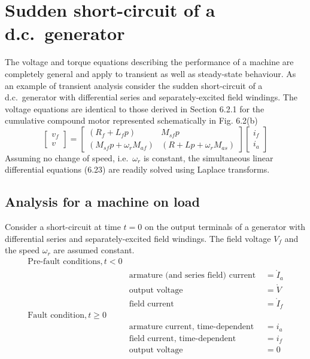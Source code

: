 \documentclass[a4paper,numbers=noenddot,12pt]{scrbook}
\begin{document}
\section{Sudden short-circuit of a d.c.\ generator}
The voltage and torque equations describing the performance of a machine are completely general and apply to transient as well as steady-state behaviour. As an example of transient analysis consider the sudden short-circuit of a d.c.\ generator with differential series and separately-excited field windings. The voltage equations are identical to those derived in Section 6.2.1 for the cumulative compound motor represented schematically in Fig. 6.2(b)
\begin{equation}
    \begin{bmatrix}
        v_f \\[2ex] v
    \end{bmatrix} =
    \begin{bmatrix}
        (R_f + L_f p) & M_{sf} p \\[2ex]
        (M_{sf} p + \omega_r M_{af}) & (R + L p + \omega_r M_{as})
    \end{bmatrix}
    \begin{bmatrix}
        i_f \\[2ex] i_a
    \end{bmatrix}
    \label{}
\end{equation}
Assuming no change of speed, i.e.\ $\omega_r$ is constant, the simultaneous linear differential equations (6.23) are readily solved using Laplace transforms.

\subsection{Analysis for a machine on load}
Consider a short-circuit at time $t=0$ on the output terminals of a generator with differential series and separately-excited field windings. The field voltage $V_f$ and the speed $\omega_r$ are assumed constant.
\begin{align*}
    \text{Pre-fault conditions}, t < 0\\
    & \text{armature (and series field) current } &= \mathring{I}_a\\
    & \text{output voltage} & = \mathring{V}\\
    & \text{field current} & = \mathring{I}_f\\
    \text{Fault condition}, t \geq 0 \\
    & \text{armature current, time-dependent} & = i_a\\
    & \text{field current, time-dependent} & = i_f \\
    & \text{output voltage} & = 0
\end{align*}
\end{document}
